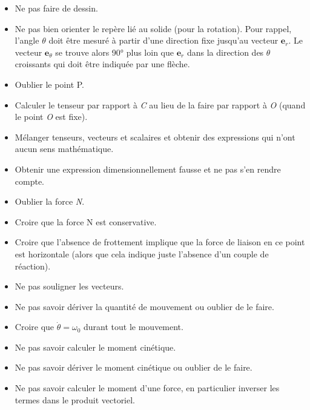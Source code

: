 \documentclass[a4paper]{article}
\begin{document}
\begin{itemize}

\item Ne pas faire de dessin.

\item Ne pas bien orienter le repère lié au solide (pour la rotation). Pour rappel, l’angle $ \theta $ doit être mesuré à partir d’une direction fixe jusqu’au vecteur $ \textbf{e}_r $. Le vecteur $ \textbf{e}_\theta $ se trouve alors 90° plus loin que $ \textbf{e}_r $ dans la direction des $ \theta $ croissants qui doit être indiquée par une flèche.

\item Oublier le point P.

\item Calculer le tenseur par rapport à \emph{C} au lieu de la faire par rapport à \emph{O} (quand le point \emph{O} est fixe).

\item Mélanger tenseurs, vecteurs et scalaires et obtenir des expressions qui n’ont aucun sens mathématique.

\item Obtenir une expression dimensionnellement fausse et ne pas s’en rendre compte.

\item Oublier la force \emph{N}.

\item Croire que la force N est conservative.

\item Croire que l’absence de frottement implique que la force de liaison en ce point est horizontale (alors que cela indique juste l’absence d’un couple de réaction).

\item Ne pas souligner les vecteurs.

\item Ne pas savoir dériver la quantité de mouvement ou oublier de le faire.

\item Croire que $ \dot{\theta} = \omega_0 $ durant tout le mouvement.

\item Ne pas savoir calculer le moment cinétique.

\item Ne pas savoir dériver le moment cinétique ou oublier de le faire.

\item Ne pas savoir calculer le moment d’une force, en particulier inverser les termes dans le produit vectoriel.


\end{itemize}
\end{document}
